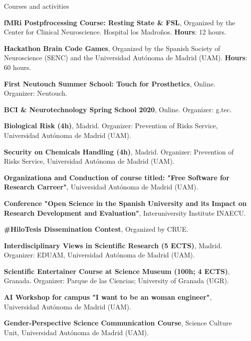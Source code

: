 \begin{rubric}{Courses and activities}

\entry*[February 2024] \textbf{fMRi Postpfrocessing Course: Resting State \& FSL}, Organized by the Center for Clinical Neuroscience. Hospital los Madroños. \textbf{Hours}: 12 hours.

\entry*[October 2021] \textbf{Hackathon Brain Code Games}, Organized by the Spanish Society of Neuroscience (SENC) and the Universidad Autónoma de Madrid (UAM). \textbf{Hours}: 60 hours.

\entry*[October 2020] \textbf{First Neutouch Summer School: Touch for Prosthetics}, Online. Organizer: Neutouch.

\entry*[April 2020] \textbf{BCI \& Neurotechnology Spring School 2020}, Online. Organizer: g.tec.


 \entry*[June 18, 2019] \textbf{Biological Risk (4h)}, Madrid. Organizer: Prevention of Risks Service, Universidad Autónoma de Madrid (UAM).

 \entry*[July 4, 2019] \textbf{Security on Chemicals Handling (4h)}, Madrid. Organizer: Prevention of Risks Service, Universidad Autónoma de Madrid (UAM).



 \textbf{Organizationa and Conduction of course titled: "Free Software for Research Carreer"}, Universidad Autónoma de Madrid (UAM).

\entry*[January 25, 2023] \textbf{Conference "Open Science in the Spanish University and its Impact on Research Development and Evaluation"}, Interuniversity Institute INAECU.

\entry*[May 2021] \textbf{\#HiloTesis Dissemination Contest}, Organized by CRUE.

 \textbf{Interdisciplinary Views in Scientific Research (5 ECTS)}, Madrid. Organizer: EDUAM, Universidad Autónoma de Madrid (UAM).

 \textbf{Scientific Entertainer Course at Science Museum (100h; 4 ECTS)}, Granada. Organizer: Parque de las Ciencias; University of Granada (UGR).

\entry*[June 2024] \textbf{AI Workshop for campus "I want to be an woman engineer"}, Universidad Autónoma de Madrid (UAM).

\entry*[February 2024] \textbf{Gender-Perspective Science Communication Course}, Science Culture Unit, Universidad Autónoma de Madrid (UAM).


\end{rubric}
